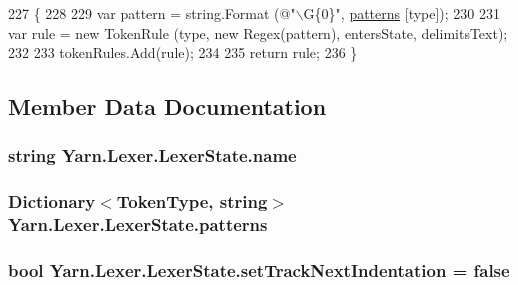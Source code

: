 \begin{DoxyCode}
227                                                                                                            
            \{
228 
229                 var pattern = string.Format (\textcolor{stringliteral}{@"\(\backslash\)G\{0\}"}, \hyperlink{a00100_a951f91e9522ffe84851f2e25e9445106}{patterns} [type]);
230 
231                 var rule = \textcolor{keyword}{new} TokenRule (type, \textcolor{keyword}{new} Regex(pattern), entersState, delimitsText);
232 
233                 tokenRules.Add(rule);
234 
235                 \textcolor{keywordflow}{return} rule;
236             \}
\end{DoxyCode}


\subsection{Member Data Documentation}
\hypertarget{a00100_aeb8debd0d81a76e90f083f0bf407573e}{
\subsubsection[{name}]{\setlength{\rightskip}{0pt plus 5cm}string Yarn.\-Lexer.\-Lexer\-State.\-name}}\label{a00100_aeb8debd0d81a76e90f083f0bf407573e}
\hypertarget{a00100_a951f91e9522ffe84851f2e25e9445106}{
\subsubsection[{patterns}]{\setlength{\rightskip}{0pt plus 5cm}Dictionary$<${\bf Token\-Type}, string$>$ Yarn.\-Lexer.\-Lexer\-State.\-patterns\hspace{0.3cm}{\ttfamily [private]}}}\label{a00100_a951f91e9522ffe84851f2e25e9445106}
\hypertarget{a00100_ad8b6ccac53bedd9dc202ffe6ac5698b2}{
\subsubsection[{set\-Track\-Next\-Indentation}]{\setlength{\rightskip}{0pt plus 5cm}bool Yarn.\-Lexer.\-Lexer\-State.\-set\-Track\-Next\-Indentation = false}}\label{a00100_ad8b6ccac53bedd9dc202ffe6ac5698b2}
